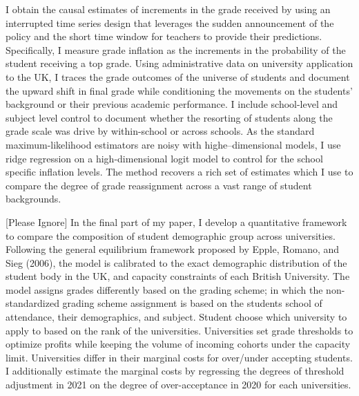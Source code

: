 I obtain the causal estimates of increments in the grade received by using an interrupted time series design that leverages the sudden announcement of the policy and the short time window for teachers to provide their predictions. Specifically, I measure grade inflation as the increments in the probability of the student receiving a top grade. Using administrative data on university application to the UK, I traces the grade outcomes of the universe of students and document the upward shift in final grade while conditioning the movements on the students' background or their previous academic performance. I include school-level and subject level control to document whether the resorting of students along the grade scale was drive by within-school or across schools. As the standard maximum-likelihood estimators are noisy with highe--dimensional models, I use ridge regression on a high-dimensional logit model to control for the school specific inflation levels.  The method recovers a rich set of estimates which I use to compare the degree of grade reassignment across a vast range of student backgrounds. 

[Please Ignore] In the final part of my paper, I develop a quantitative framework to compare the composition of student demographic group across universities. Following the general equilibrium framework proposed by Epple, Romano, and Sieg (2006), the model is calibrated to the exact demographic distribution of the student body in the UK, and capacity constraints of each British University. The model assigns grades differently based on the grading scheme; in which the non-standardized grading scheme assignment is based on the students school of attendance, their demographics, and subject. Student choose which university to apply to based on the rank of the universities. Universities set grade thresholds to optimize profits while keeping the volume of incoming cohorts under the capacity limit. Universities differ in their marginal costs for over/under accepting students. I additionally estimate the marginal costs by regressing the degrees of threshold adjustment in 2021 on the degree of over-acceptance in 2020 for each universities. 

\

